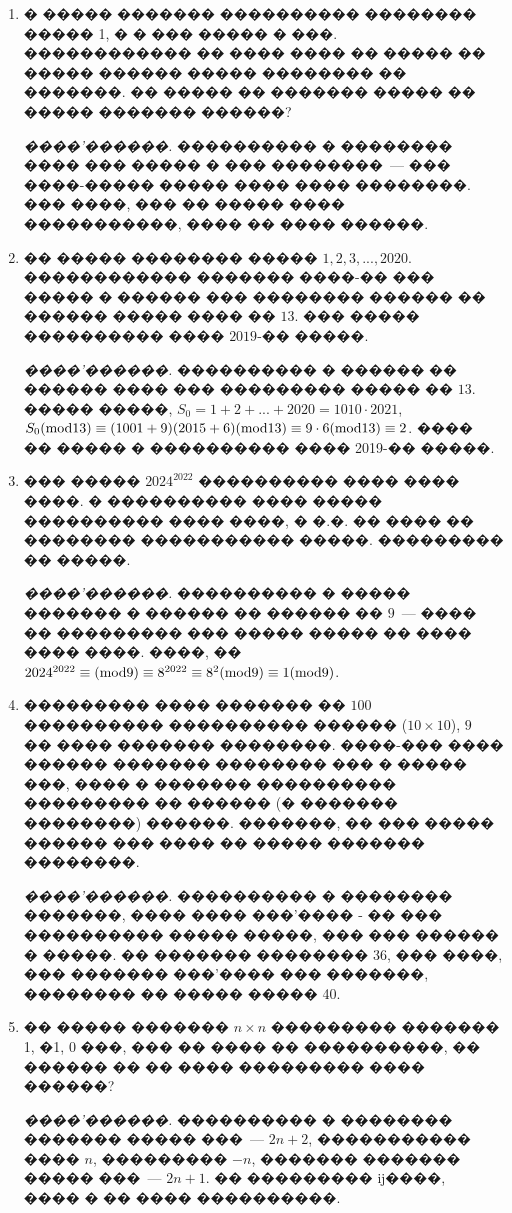 \documentclass[a4paper,12pt]{article}
\begin{document}
\begin{enumerate}
\item � ����� ������� ���������� �������� ����� 1, � � ��� ����� � ���.
������������ �� ���� ���� �� ����� �� ����� ������ ����� �������� �� �������. �� �����
�� ������� ����� �� ����� ������� ������?

\textit{����'������.} ���������� � �������� ���� ��� ����� � ��� ��������~--- ��� ����-����� ����� ���� ���� ��������. ��� ����, ��� �� ����� ���� �����������, ���� �� ���� ������.

\item �� ����� �������� ����� $1,2,3,...,2020$. ������������ ������� ����-�� ��� ����� � ������ ��� �������� ������  �� ������ ����� ���� �� $13$. ��� ����� ���������� ���� $2019$-�� �����.

\textit{����'������.} ���������� � ������ �� ������ ���� ��� ��������� ����� �� $13$. ����� �����, $S_{0}=1+2+...+2020=1010\cdot 2021$, $S_{0}(\textmd{mod} 13)\equiv (1001+9)(2015+6)(\textmd{mod} 13)\equiv 9\cdot 6 (\textmd{mod} 13)\equiv 2$. ���� �� ����� � ���������� ���� 2019-�� �����.

\item ��� ����� $2024^{2022}$ ���������� ���� ���� ����. � ���������� ���� ����� ���������� ���� ����, � �.�. �� ���� �� �������� ����������� �����. ��������� �� �����.

\textit{����'������.} ���������� � ����� ������� � ������ �� ������ �� $9$~--- ���� �� ��������� ��� ����� ����� �� ���� ���� ����. ����, �� $2024^{2022}\equiv (\textmd{mod} 9)\equiv 8^{2022}\equiv 8^{2}(\textmd{mod} 9)\equiv 1(\textmd{mod} 9)$.

\item ��������� ���� ������� �� $100$ ���������� ���������� ������ ($10\times 10$), $9$ ��
���� ������� ��������. ����-��� ���� ������ ������� �������� ��� � ����� ���, ���� �
������� ���������� ��������� �� ������ (� ������� ��������) ������. �������, �� ��� ����� ������ ��� ���� �� ����� ������� ��������.

\textit{����'������.} ���������� � �������� �������, ���� ���� ���'���� - �� ��� ���������� ����� �����, ��� ��� ������ � �����. �� ������� �������� 36, ��� ����, ��� ������� ���'���� ��� �������, �������� �� ����� ����� 40.

\item �� ����� ������� $n\times n$ ��������� ������� 1, �1, 0 ���, ��� �� ���� �� ����������, �� ������ �� �� ���� ��������� ���� ������?

\textit{����'������.} ���������� � �������� ������� ����� ���~--- $2n+2$, ����������� ���� $n$, ��������� $-n$, ������� ������� ����� ���~--- $2n+1$. �� ��������� ĳ����, ���� � �� ���� ����������.


\end{enumerate}
\end{document}

